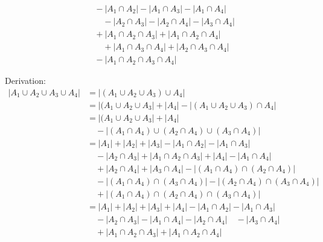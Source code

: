 \documentclass[10pt,]{book}
\theoremstyle{plain}
\theoremstyle{definition}
\theoremstyle{definition}
\theoremstyle{definition}
\begin{document}
\begin{exercisegroup}
\begin{equation*}
\begin{split}
	& \quad  -\lvert A_1\cap A_2\rvert  -\lvert A_1\cap A_3\rvert  -\lvert A_1\cap A_4\rvert \\
	& \quad \quad -\lvert A_2\cap A_3\rvert   -\lvert A_2\cap A_4\rvert -\lvert A_3\cap A_4\rvert   \\
	& \quad +\lvert A_1\cap A_2\cap A_3\rvert +\lvert A_1\cap A_2\cap A_4\rvert   \\
   & \quad \quad +\lvert A_1\cap A_3\cap A_4\rvert +\lvert A_2\cap A_3\cap A_4\rvert \\
   & \quad   -\lvert A_1\cap A_2\cap A_3\cap A_4\rvert  
\end{split}
\end{equation*}
%
\par
Derivation:
\begin{equation*}
\begin{split}
\lvert A_1\cup A_2\cup A_3\cup A_4\rvert & = \lvert (A_1\cup A_2\cup A_3)\cup A_4\rvert  \\
   & = \lvert  (A_1\cup A_2\cup A_3\rvert   +\lvert  A_4\rvert  -\lvert (A_1\cup A_2\cup A_3)\cap A_4\rvert\\
   & = \lvert  (A_1\cup A_2\cup A_3\rvert   +\lvert  A_4\rvert \\
   & \quad -\lvert (A_1\cap A_4)\cup (A_2\cap A_4)\cup (A_3\cap A_4)\rvert  \\
   & = \lvert  A_1\rvert  +\lvert  A_2\rvert  +\lvert  A_3\rvert  -\lvert A_1\cap A_2\rvert  -\lvert A_1\cap A_3\rvert  \\
   & \quad -\lvert A_2\cap A_3\rvert   +\lvert A_1\cap A_2\cap A_3\rvert   +\lvert  A_4\rvert  -\lvert A_1\cap A_4\rvert    \\
   & \quad+\lvert A_2\cap A_4\rvert   +\lvert A_3\cap A_4\rvert  -\lvert (A_1\cap A_4)\cap (A_2\cap A_4)\rvert  \\
   & \quad  -\lvert (A_1\cap A_4)\cap (A_3\cap A_4)\rvert   -\lvert (A_2\cap A_4)\cap (A_3\cap A_4)\rvert \\
   & \quad  +\lvert (A_1\cap A_4)\cap (A_2\cap A_4)\cap (A_3\cap A_4)\rvert  \\
   & =\lvert  A_1\rvert  +\lvert  A_2\rvert  +\lvert  A_3\rvert  +\lvert  A_4\rvert  -\lvert A_1\cap A_2\rvert   -\lvert A_1\cap A_3\rvert   \\
   & \quad  -\lvert A_2\cap A_3\rvert   -\lvert A_1\cap A_4\rvert   -\lvert A_2\cap A_4\rvert  \quad  -\lvert A_3\cap A_4\rvert  \\
   & \quad  +\lvert A_1\cap A_2\cap A_3\rvert  +\lvert A_1\cap A_2\cap A_4\rvert  \\

\end{split}
\end{equation*}
\end{exercisegroup}
\end{document}

